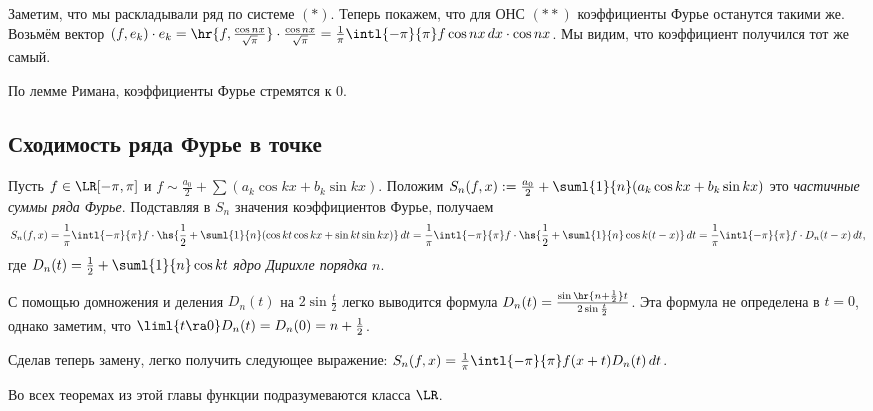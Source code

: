 \documentclass[a4paper]{article}
\newcommand{\intlpp}{\intl{-\pi}{\pi}}
\newcommand{\frpi}{\frac{1}{\pi}}
\begin{document}
Заметим, что мы раскладывали ряд по системе $(*)$. Теперь покажем, что для ОНС $(**)$ коэффициенты
Фурье останутся такими же. Возьмём вектор $(f,e_k) \cdot e_k = \hr{f, \frac{\cos
nx}{\sqrt{\pi}}}\cdot \frac{\cos nx}{\sqrt{\pi}} = \frpi \intlpp f \cos nx \,d x \cdot \cos nx$.
Мы видим, что коэффициент получился тот же самый.

\begin{note}
По лемме Римана, коэффициенты Фурье стремятся к 0.
\end{note}

\subsection{Сходимость ряда Фурье в точке}

Пусть $f \in\LR[-\pi,\pi]$ и $f \sim \frac{a_0}{2} + \sum (a_k \cos kx + b_k \sin kx)$. Положим
$S_n(f,x) := \frac{a_0}{2} + \suml{1}{n}(a_k \cos kx + b_k \sin kx)$ это \emph{частичные суммы
ряда Фурье}. Подставляя в $S_n$ значения коэффициентов Фурье, получаем
$$S_n(f,x) = \frpi \intlpp
f\cdot\hs{\frac{1}{2} + \suml{1}{n}(\cos kt \cos kx + \sin kt \sin kx)} \,d t= \frpi \intlpp
f\cdot\hs{\frac{1}{2} + \suml{1}{n}\cos k(t-x)}\,d t = \frpi \intlpp f \cdot D_n(t-x) \,d t,$$
где $D_n(t) = \frac{1}{2} + \suml{1}{n}\cos kt$ \emph{ядро Дирихле порядка} $n$.

С помощью домножения и деления $D_n(t)$ на $2\sin \frac{t}{2}$ легко выводится формула $D_n(t) = \frac{\sin\hr{n + \frac{1}{2}}t}{2\sin \frac{t}{2}}$.
Эта формула не определена в $t = 0$, однако заметим, что $\liml{t \ra 0} D_n(t) = D_n(0) = n + \frac{1}{2}$.

Сделав теперь замену, легко получить следующее выражение: $S_n(f,x) = \frpi \intlpp
f(x+t)D_n(t)\,d t$.

\begin{note}
Во всех теоремах из этой главы функции подразумеваются класса $\LR$.
\end{note}
\end{document}
